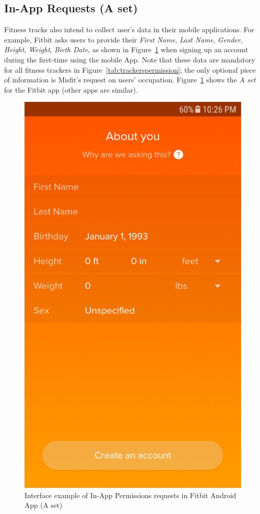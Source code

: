 \subsection{In-App Requests (A set)}
Fitness tracks also intend to collect user's data in their mobile applications. For example, Fitbit asks users to provide their \textit{First Name}, \textit{Last Name}, \textit{Gender}, \textit{Height}, \textit{Weight}, \textit{Birth Date}, as shown in Figure~\ref{fig:fitbitA} when signing up an account during the first-time using the mobile App. Note that these data are mandatory for all fitness trackers in Figure~\ref{tab:trackerspermission}; the only optional piece of information is Misfit's request on users' occupation. Figure~\ref{fig:fitbitA} shows the \emph{A set} for the Fitbit app (other apps are similar).
\begin{figure}
	\centering
	\includegraphics[width=0.2\textheight]{figures/Aset.png}
	\caption{Interface example of In-App Permissions requests in Fitbit Android App (A set)}
	\label{fig:fitbitA}
\end{figure}

